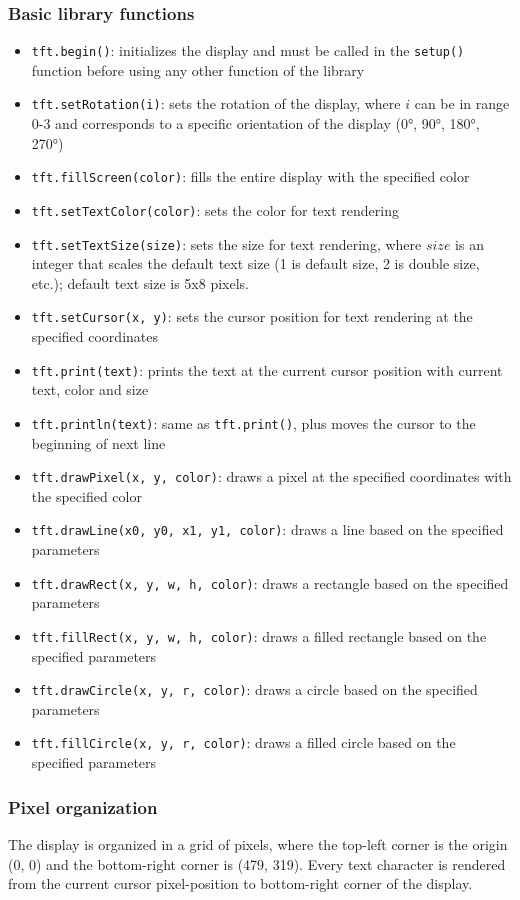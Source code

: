 \subsubsection*{Basic library functions}
\begin{itemize}
	\item \texttt{tft.begin()}: initializes the display and must be called in the \texttt{setup()} function before using
	any other function of the library
	\item \texttt{tft.setRotation(i)}: sets the rotation of the display, where \(i\) can be in range 0-3 and corresponds
	to a specific orientation of the display (0°, 90°, 180°, 270°)
	\item \texttt{tft.fillScreen(color)}: fills the entire display with the specified color
	\item \texttt{tft.setTextColor(color)}: sets the color for text rendering
	\item \texttt{tft.setTextSize(size)}: sets the size for text rendering, where \(size\) is an integer that scales the
	default text size (1 is default size, 2 is double size, etc.); default text size is 5x8 pixels.
	\item \texttt{tft.setCursor(x, y)}: sets the cursor position for text rendering at the specified coordinates
	\item \texttt{tft.print(text)}: prints the text at the current cursor position with current text, color and size
	\item \texttt{tft.println(text)}: same as \texttt{tft.print()}, plus moves the cursor to the beginning of next line
	\item \texttt{tft.drawPixel(x, y, color)}: draws a pixel at the specified coordinates with the specified color
	\item \texttt{tft.drawLine(x0, y0, x1, y1, color)}: draws a line based on the specified parameters
	\item \texttt{tft.drawRect(x, y, w, h, color)}: draws a rectangle based on the specified parameters
	\item \texttt{tft.fillRect(x, y, w, h, color)}: draws a filled rectangle based on the specified parameters
	\item \texttt{tft.drawCircle(x, y, r, color)}: draws a circle based on the specified parameters
	\item \texttt{tft.fillCircle(x, y, r, color)}: draws a filled circle based on the specified parameters
\end{itemize}

\subsubsection*{Pixel organization}
The display is organized in a grid of pixels, where the top-left corner is the origin (0, 0) and the bottom-right corner is
(479, 319). Every text character is rendered from the current cursor pixel-position to bottom-right corner of the display.

